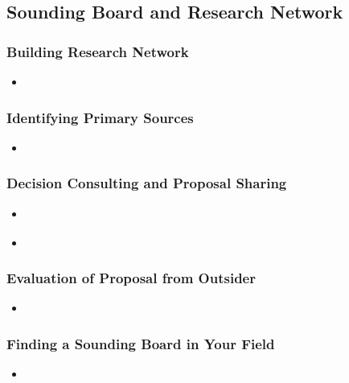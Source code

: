 \documentclass[11pt]{article}
\begin{document}
\subsection{Sounding Board and Research Network}
\subsubsection{Building Research Network}
\begin{itemize}
\item  \begin{exercise}
\end{exercise}
\end{itemize}
\subsubsection{Identifying Primary Sources}
\begin{itemize}
\item  \begin{exercise}
\end{exercise}
\end{itemize}
\subsubsection{Decision Consulting and Proposal Sharing}
\begin{itemize}
\item \begin{exercise}
\end{exercise}
\item \begin{exercise}
\end{exercise}
\end{itemize}
\subsubsection{Evaluation of Proposal from Outsider}
\begin{itemize}
\item \begin{exercise}
\end{exercise}
\end{itemize}
\subsubsection{Finding a Sounding Board in Your Field}
\begin{itemize}
\item \begin{exercise}
\end{exercise}
\end{itemize}
\end{document}
